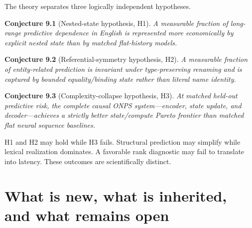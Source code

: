 \documentclass[11pt]{article}
\begin{document}
The theory separates three logically independent hypotheses.

\textbf{Conjecture 9.1} (Nested-state hypothesis, H1). \emph{A measurable fraction of long-range predictive dependence in English is represented more economically by explicit nested state than by matched flat-history models.}

\textbf{Conjecture 9.2} (Referential-symmetry hypothesis, H2). \emph{A measurable fraction of entity-related prediction is invariant under type-preserving renaming and is captured by bounded equality/binding state rather than literal name identity.}

\textbf{Conjecture 9.3} (Complexity-collapse hypothesis, H3). \emph{At matched held-out predictive risk, the complete causal ONPS system---encoder, state update, and decoder---achieves a strictly better state/compute Pareto frontier than matched flat neural sequence baselines.}

H1 and H2 may hold while H3 fails. Structural prediction may simplify while lexical realization dominates. A favorable rank diagnostic may fail to translate into latency. These outcomes are scientifically distinct.

\section{What is new, what is inherited, and what remains open}\label{what-is-new-what-is-inherited-and-what-remains-open}
\end{document}
